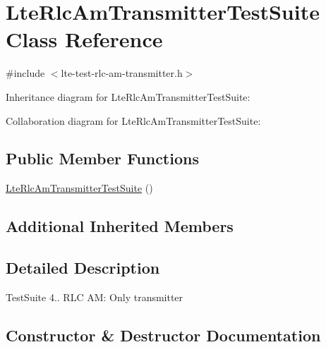 \hypertarget{classLteRlcAmTransmitterTestSuite}{}\section{Lte\+Rlc\+Am\+Transmitter\+Test\+Suite Class Reference}
\label{classLteRlcAmTransmitterTestSuite}


{\ttfamily \#include $<$lte-\/test-\/rlc-\/am-\/transmitter.\+h$>$}



Inheritance diagram for Lte\+Rlc\+Am\+Transmitter\+Test\+Suite\+:


Collaboration diagram for Lte\+Rlc\+Am\+Transmitter\+Test\+Suite\+:
\subsection*{Public Member Functions}
\begin{DoxyCompactItemize}
\item 
\hyperlink{classLteRlcAmTransmitterTestSuite_ab9501ea686d5f78d8baa597d50f8ff8f}{Lte\+Rlc\+Am\+Transmitter\+Test\+Suite} ()
\end{DoxyCompactItemize}
\subsection*{Additional Inherited Members}


\subsection{Detailed Description}
Test\+Suite 4.. R\+LC AM\+: Only transmitter 

\subsection{Constructor \& Destructor Documentation}

